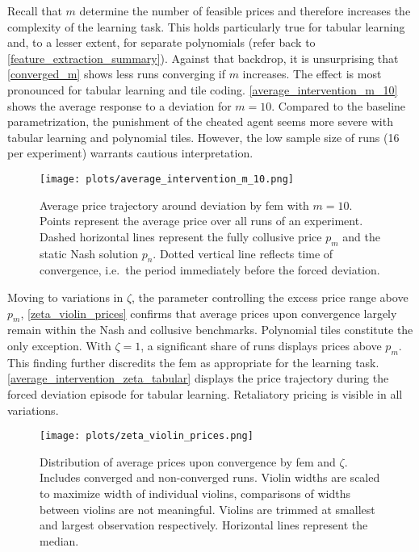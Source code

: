 Recall that $m$ determine the number of feasible prices and therefore increases the complexity of the learning task. This holds particularly true for tabular learning and, to a lesser extent, for separate polynomials (refer back to \autoref{feature_extraction_summary}). Against that backdrop, it is unsurprising that \autoref{converged_m} shows less runs converging if $m$ increases. The effect is most pronounced for tabular learning and tile coding. \autoref{average_intervention_m_10} shows the average response to a deviation for $m=10$. Compared to the baseline parametrization, the punishment of the cheated agent seems more severe with tabular learning and polynomial tiles. However, the low sample size of runs (16 per experiment) warrants cautious interpretation.

\begin{figure}
	\texttt{[image: plots/average\_intervention\_m\_10.png]}
	\caption[Average price trajectory around deviation by \gls{fem}with  $m=10$]{Average price trajectory around deviation by \gls{fem} with $m=10$. Points represent the average price over all runs of an experiment. Dashed horizontal lines represent the fully collusive price $p_m$ and the static Nash solution $p_n$. Dotted vertical line reflects time of convergence, i.e.\ the period immediately before the forced deviation.}
	\label{average_intervention_m_10}
\end{figure}

Moving to variations in $\zeta$, the parameter controlling the excess price range above $p_m$, \autoref{zeta_violin_prices} confirms that average prices upon convergence largely remain within the Nash and collusive benchmarks. Polynomial tiles constitute the only exception. With $\zeta = 1$, a significant share of runs displays prices above $p_m$. This finding further discredits the \gls{fem} as appropriate for the learning task. \autoref{average_intervention_zeta_tabular} displays the price trajectory during the forced deviation episode for tabular learning. Retaliatory pricing is visible in all variations.

\begin{figure}
	\texttt{[image: plots/zeta\_violin\_prices.png]}
	\caption[Distribution of average prices by \gls{fem} and $\zeta$]{Distribution of average prices upon convergence by \gls{fem} and $\zeta$. Includes converged and non-converged runs. Violin widths are scaled to maximize width of individual violins, comparisons of widths between violins are not meaningful. Violins are trimmed at smallest and largest observation respectively. Horizontal lines represent the median.}
	\label{zeta_violin_prices}
\end{figure}



